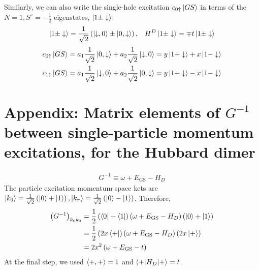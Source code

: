 \documentclass[12pt]{article}
\numberwithin{equation}{section}
\begin{document}
Similarly, we can also write the single-hole excitation $c_{0 \uparrow}\ket{GS}$ in terms of the $N=1, S^z = -\frac{1}{2}$ eigenstates, $\ket{1\pm \downarrow}$:
\begin{equation}\begin{aligned}
	\ket{1\pm \downarrow} = \frac{1}{\sqrt 2}\left(\ket{\downarrow, 0} \pm \ket{0, \downarrow}\right), && H^D \ket{1\pm \downarrow} = \mp t\ket{1\pm \downarrow}
\end{aligned}\end{equation}
\begin{equation}\begin{aligned}
	c_{0 \uparrow}\ket{GS} = a_1 \frac{1}{\sqrt 2}\ket{0, \downarrow} + a_2 \frac{1}{\sqrt 2}\ket{\downarrow, 0} = y\ket{1+ \downarrow} + x\ket{1- \downarrow}\\
	c_{1 \uparrow}\ket{GS} = a_1 \frac{1}{\sqrt 2}\ket{\downarrow, 0} + a_2 \frac{1}{\sqrt 2}\ket{0, \downarrow} = y\ket{1+ \downarrow} - x\ket{1- \downarrow}\\
\end{aligned}\end{equation}



\section{Appendix: Matrix elements of $G^{-1}$ between single-particle momentum excitations, for the Hubbard dimer}
\begin{equation}\begin{aligned}
	G^{-1} \equiv \omega + E_\text{GS} - H_D
\end{aligned}\end{equation}
The particle excitation momentum space kets are $\ket{k_0} = \frac{1}{\sqrt 2}\left(\ket{0} + \ket{1}\right) ,\ket{k_\pi} = \frac{1}{\sqrt 2}\left(\ket{0} - \ket{1}\right)$. Therefore,
\begin{equation}\begin{aligned}
	\left(G^{-1}\right)_{k_0 k_0} &= \frac{1}{2}\left(\bra{0} + \bra{1}\right)\left(\omega + E_\text{GS} - H_D\right)\left(\ket{0} + \ket{1}\right)\\
				      &= \frac{1}{2}\left(2x\bra{+}\right)\left(\omega + E_\text{GS} - H_D\right)\left(2x\ket{+}\right)\\
				      &= 2x^2\left(\omega + E_\text{GS} - t\right)\\
\end{aligned}\end{equation}
At the final step, we used $\braket{+,+} = 1$ and $\braket{+|H_D|+} = t$.


\end{document}

